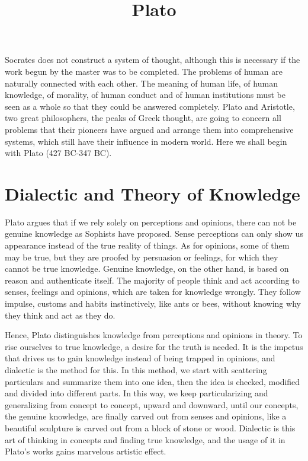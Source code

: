 \documentclass[11pt]{article}
\title{Plato}
\date{}
\begin{document}
\begin{sloppypar}
  \maketitle

  \linenumbers

Socrates does not construct a system of thought, although this is necessary if the work begun by the master was to be completed. 
The problems of human are naturally connected with each other. 
The meaning of human life, of human knowledge, of morality, of human conduct and of human institutions must be seen as a whole so that they could be answered completely. 
Plato and Aristotle, two great philosophers, the peaks of Greek thought, are going to concern all problems that their pioneers have argued and arrange them into comprehensive systems, which still have their influence in modern world. 
Here we shall begin with Plato (427 BC-347 BC).

\section{Dialectic and Theory of Knowledge}
Plato argues that if we rely solely on perceptions and opinions, there can not be genuine knowledge as Sophists have proposed. 
Sense perceptions can only show us appearance instead of the true reality of things. 
As for opinions, some of them may be true, but they are proofed by persuasion or feelings, for which they cannot be true knowledge. 
Genuine knowledge, on the other hand, is based on reason and authenticate itself. 
The majority of people think and act according to senses, feelings and opinions, which are taken for knowledge wrongly. 
They follow impulse, customs and habits instinctively, like ants or bees, without knowing why they think and act as they do.

\newline

Hence, Plato distinguishes knowledge from perceptions and opinions in theory. 
To rise ourselves to true knowledge, a desire for the truth is needed. 
It is the impetus that drives us to gain knowledge instead of being trapped in opinions, and dialectic is the method for this. 
In this method, we start with scattering particulars and summarize them into one idea, then the idea is checked, modified and divided into different parts. 
In this way, we keep particularizing and generalizing from concept to concept, upward and downward, until our concepts, the genuine knowledge, are finally carved out from senses and opinions, like a beautiful sculpture is carved out from a block of stone or wood. 
Dialectic is this art of thinking in concepts and finding true knowledge, and the usage of it in Plato’s works gains marvelous artistic effect.


\end{sloppypar}
\end{document}
